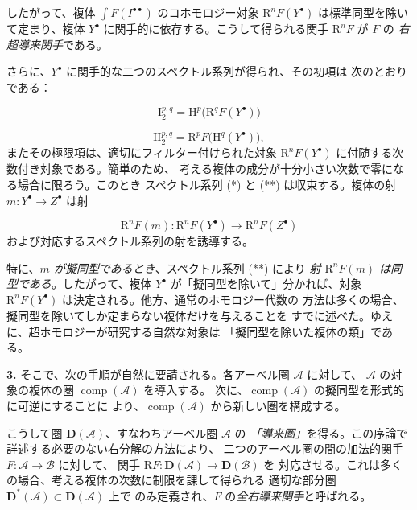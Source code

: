 \clearpage
{}
したがって、複体 $\int F(I^{\bullet\bullet})$ のコホモロジー対象
$\mathrm R^nF(Y^{\bullet})$ は標準同型を除いて定まり、複体 $Y^{\bullet}$
に関手的に依存する。こうして得られる関手 $\mathrm R^nF$ が $F$ の
\emph{右超導来関手}である。

さらに、$Y^{\bullet}$ に関手的な二つのスペクトル系列が得られ、その初項は
次のとおりである：

\begin{equation}
\mathrm I_2^{p,q}=\mathrm H^p\bigl(\mathrm R^qF(Y^{\bullet})\bigr)
\tag{*}
\end{equation}

\begin{equation}
\mathrm{II}_2^{p,q}=\mathrm R^pF\bigl(\mathrm H^q(Y^{\bullet})\bigr),
\tag{**}
\end{equation}
またその極限項は、適切にフィルター付けられた対象
$\mathrm R^nF(Y^{\bullet})$ に付随する次数付き対象である。簡単のため、
考える複体の成分が十分小さい次数で零になる場合に限ろう。このとき
スペクトル系列 (*) と (**) は収束する。複体の射
$m:Y^{\bullet}\to Z^{\bullet}$ は射

\[
\mathrm R^nF(m):\mathrm R^nF(Y^{\bullet})
\longrightarrow \mathrm R^nF(Z^{\bullet})
\]
および対応するスペクトル系列の射を誘導する。

特に、\emph{$m$ が擬同型であるとき}、スペクトル系列 (**) により
\emph{射 $\mathrm R^nF(m)$ は同型である}。したがって、複体
$Y^{\bullet}$ が「擬同型を除いて」分かれば、対象
$\mathrm R^nF(Y^{\bullet})$ は決定される。他方、通常のホモロジー代数の
方法は多くの場合、擬同型を除いてしか定まらない複体だけを与えることを
すでに述べた。ゆえに、超ホモロジーが研究する自然な対象は
「擬同型を除いた複体の類」である。

\noindent\textbf{3.}\quad
そこで、次の手順が自然に要請される。各アーベル圏 $\mathcal A$ に対して、
$\mathcal A$ の対象の複体の圏 $\operatorname{comp}(\mathcal A)$ を導入する。
次に、$\operatorname{comp}(\mathcal A)$ の擬同型を形式的に可逆にすることに
より、$\operatorname{comp}(\mathcal A)$ から新しい圏を構成する。

こうして圏 $\mathbf D(\mathcal A)$、すなわちアーベル圏 $\mathcal A$ の
\emph{「導来圏」}を得る。この序論で詳述する必要のない右分解の方法により、
二つのアーベル圏の間の加法的関手 $F:\mathcal A\to\mathcal B$ に対して、
関手 $\mathrm RF:\mathbf D(\mathcal A)\to\mathbf D(\mathcal B)$ を
対応させる。これは多くの場合、考える複体の次数に制限を課して得られる
適切な部分圏 $\mathbf D^*(\mathcal A)\subset\mathbf D(\mathcal A)$ 上で
のみ定義され、$F$ の\emph{全右導来関手}と呼ばれる。

